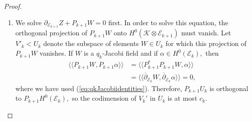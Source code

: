 \documentclass[11pt]{article}
\theoremstyle{definition}
\newcommand{\del}{\partial}
\newcommand{\delbar}{\overline{\partial}}
\newcommand{\llangle}{\langle\!\langle}
\newcommand{\rrangle}{\rangle\!\rangle}
\numberwithin{equation}{section}
\begin{document}
\begin{proof}
\begin{enumerate}[label=(\alph*)]
        For $Z \in U_{k+1}',$ choose the solution $W$ of $\delbar_{\mathcal{E}_{k}} W - P^\dagger_{k+1} Z = 0$ with $W \in \ker(\delbar_{\mathcal{E}_{k}} )^\perp$ and let $Y = \del_{\mathcal{E}_{k+1}} Z + P_{k+1} W.$ Proposition \ref{prop:commutident} and (\ref{eq:qkJacobiidentities}) give
        \begin{equation*}
            \begin{aligned}
                \del^*_{\mathcal{E}_{k+1}} Y &= \del^*_{\mathcal{E}_{k+1}} \del_{\mathcal{E}_{k+1}} Z + \del^*_{\mathcal{E}_{k+1}} P_{k+1} W \\
                &= (P_{k+1}^\dagger)^* P_{k+1}^\dagger Z + \del^*_{\mathcal{E}_{k+1}} P_{k+1} W \\
                &= \left( (P_{k+1}^\dagger)^* \delbar_{\mathcal{E}_{k}} + \del^*_{\mathcal{E}_{k+1}} P_{k+1} \right) W = 0,
            \end{aligned}
        \end{equation*}
        so $Y \in H^0(\mathcal{K} \otimes \mathcal{E}_{k+1}).$ Replacing $W$ by $W+\tau$ with $\tau \in H^0(\mathcal{E}_k)$ changes $Y$ by $P_{k+1} \tau.$ Let $U''_{k+1}$ denote the subspace of $U_{k+1}'$ for which the class of $Y$ in ${H^0(\mathcal{K} \otimes \mathcal{E}_{k+1})}/{P_{k+1} H^0(\mathcal{E}_k)}$ is $0.$ The codimension of $U''_{k+1}$ in $U'_{k+1}$ is at most $c_k.$ Given $Z \in U_{k+1}'',$ we can find $W' \in \Gamma(\mathcal{E}_k)$ satisfying both equations in (\ref{eq:nullityextension}), unique up to an element in $\ker(\delbar_{\mathcal{E}_k}) \cap \ker(P_{k+1}) = H^0(\mathcal{A}_k).$ Therefore, by Lemma \ref{lem:ckdkcalc},
        \begin{equation}
            \nu_k \geq \nu_{k+1} - c_k - d_k + h^0(\mathcal{A}_k) = \nu_{k+1} + \chi(\mathcal{A}_k) - (n-k-1)b_{k+1}.
        \end{equation}
        
        \item We solve $\del_{\mathcal{E}_{k+1}} Z + P_{k+1} W = 0$ first. In order to solve this equation, the orthogonal projection of $P_{k+1}W$ onto $H^0(\mathcal K \otimes \mathcal E_{k+1})$ must vanish. Let $V'_{k} < U_k$ denote the subspace of elements $W \in U_k$ for which this projection of $P_{k+1}W$ vanishes. If $W$ is a $q_k$-Jacobi field and if $\alpha \in H^0(\mathcal{E}_k),$ then
        \begin{equation*}
        \begin{aligned}
             \llangle P_{k+1} W, P_{k+1} \alpha \rrangle  &= \llangle P_{k+1}^* P_{k+1} W, \alpha \rrangle \\
             &= \llangle \delbar_{\mathcal{E}_k} W, \delbar_{\mathcal{E}_k} \alpha \rrangle = 0,
        \end{aligned}
        \end{equation*}
        where we have used (\ref{eq:qkJacobiidentities}). Therefore, $P_{k+1} U_k$ is orthogonal to $P_{k+1} H^0(\mathcal{E}_k),$ so the codimension of $V_k'$ in $U_k$ is at most $c_k.$


\end{enumerate}
\end{proof}
\end{document}
